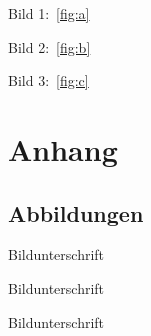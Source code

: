 \documentclass{scrreprt}
\begin{document}
Bild 1:~\ref{fig:a}

Bild 2:~\ref{fig:b}

Bild 3:~\ref{fig:c}

\appendix
\chapter{Anhang}
\section{Abbildungen}

\begin{measuredfigure}[h]
\caption[Verzeichnis]{Bildunterschrift}
\label{fig:a}		
\end{measuredfigure}

\begin{measuredfigure}[h]
\caption[Verzeichnis]{Bildunterschrift\label{fig:b}}	
\end{measuredfigure}

\begin{measuredfigure}[h]
\caption[Verzeichnis]{Bildunterschrift}
\label{fig:c}		
\end{measuredfigure}
\end{document}
